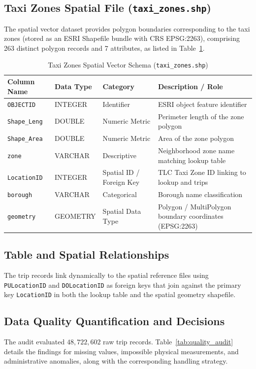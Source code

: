 \documentclass[11pt,a4paper]{article}
\begin{document}
\subsection{Taxi Zones Spatial File (\texttt{taxi\_zones.shp})}
The spatial vector dataset provides polygon boundaries corresponding to the taxi zones (stored as an ESRI Shapefile bundle with CRS EPSG:2263), comprising 263 distinct polygon records and 7 attributes, as listed in Table~\ref{tab:spatial_schema}.

\begin{table}[htbp]
\centering
\caption{Taxi Zones Spatial Vector Schema (\texttt{taxi\_zones.shp})}
\label{tab:spatial_schema}
\small
\begin{tabularx}{\textwidth}{llXX}
\toprule
\textbf{Column Name} & \textbf{Data Type} & \textbf{Category} & \textbf{Description / Role} \\
\midrule
\texttt{OBJECTID} & INTEGER & Identifier & ESRI object feature identifier \\
\texttt{Shape\_Leng} & DOUBLE & Numeric Metric & Perimeter length of the zone polygon \\
\texttt{Shape\_Area} & DOUBLE & Numeric Metric & Area of the zone polygon \\
\texttt{zone} & VARCHAR & Descriptive & Neighborhood zone name matching lookup table \\
\texttt{LocationID} & INTEGER & Spatial ID / Foreign Key & TLC Taxi Zone ID linking to lookup and trips \\
\texttt{borough} & VARCHAR & Categorical & Borough name classification \\
\texttt{geometry} & GEOMETRY & Spatial Data Type & Polygon / MultiPolygon boundary coordinates (EPSG:2263) \\
\bottomrule
\end{tabularx}
\end{table}

\subsection{Table and Spatial Relationships}
The trip records link dynamically to the spatial reference files using \texttt{PULocationID} and \texttt{DOLocationID} as foreign keys that join against the primary key \texttt{LocationID} in both the lookup table and the spatial geometry shapefile.

\subsection{Data Quality Quantification and Decisions}
The audit evaluated $48,722,602$ raw trip records. Table~\ref{tab:quality_audit} details the findings for missing values, impossible physical measurements, and administrative anomalies, along with the corresponding handling strategy.
\end{document}
